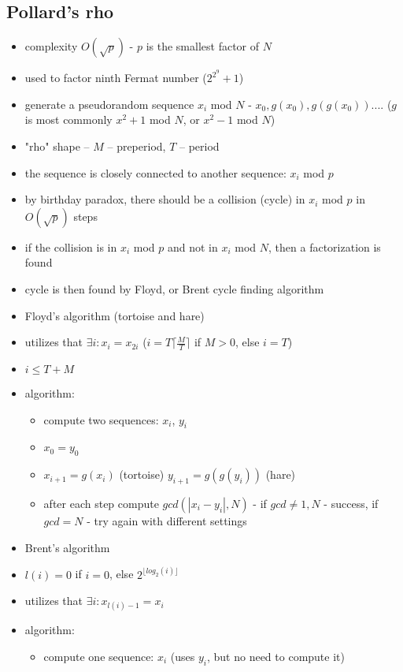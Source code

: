 \subsection*{Pollard's rho}
\begin{itemize}
	\item complexity $O(\sqrt{p})$ - $p$ is the smallest factor of $N$
	\item used to factor ninth Fermat number ($2^{2^9}+1$)
    \item generate a pseudorandom sequence $x_i$ mod $N$ - $x_0, g(x_0), g(g(x_0))....$ ($g$ is most commonly $x^2 +1$ mod $N$, or $x^2 -1$ mod $N$)
    \item "rho" shape -- $M$ -- preperiod, $T$ -- period
    \item the sequence is closely connected to another sequence: $x_i$ mod $p$
    \item by birthday paradox, there should be a collision (cycle) in $x_i$ mod $p$ in $O(\sqrt{p})$ steps
    \item if the collision is in $x_i$ mod $p$ and not in $x_i$ mod $N$, then a factorization is found
    \item cycle is then found by Floyd, or Brent cycle finding algorithm
    \item Floyd's algorithm (tortoise and hare)
	\item utilizes that $\exists i: x_i=x_{2i}$ ($i = T \lceil \frac{M}{T} \rceil $ if $M>0$, else $i = T$)
	\item $i\leq T+M$
	\item algorithm:
    \begin{itemize}
    	\item compute two sequences: $x_i$, $y_i$
		\item $x_0 = y_0$
		\item $x_{i+1} = g(x_i)$ (tortoise) $y_{i+1} = g(g(y_i))$ (hare)
		\item after each step compute $gcd(|x_i - y_i|, N)$ - if $gcd \neq 1, N$ - success, if $gcd = N$ - try again with different settings
	\end{itemize}
	\item Brent's algorithm
	\item $l(i) = 0$ if $i = 0$, else $2^{\lfloor log_2(i)\rfloor}$
	\item utilizes that $\exists i: x_{l(i)-1}=x_i$
	\item algorithm:
	\begin{itemize}
		\item compute one sequence: $x_i$ (uses $y_i$, but no need to compute it)

\end{itemize}
\end{itemize}

